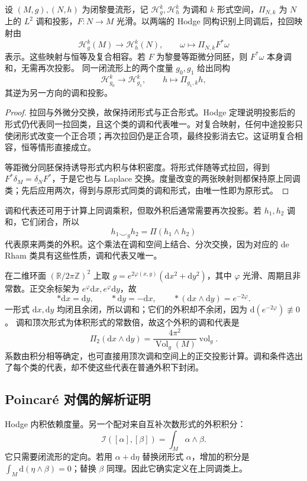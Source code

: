 \begin{proposition}\label{g3:prop:hodge-naturality}
	设 \((M,g),(N,h)\) 为闭黎曼流形，记 \(\mathcal H_g^k,\mathcal H_h^k\) 为调和 \(k\) 形式空间，\(\Pi_{N,k}\) 为 \(N\) 上的 \(L^2\) 调和投影，\(F:N\to M\) 光滑。以两端的 Hodge 同构识别上同调后，拉回映射由
	\[
		\mathcal H_g^k(M)\longrightarrow\mathcal H_h^k(N),
		\qquad\omega\longmapsto\Pi_{N,k}F^*\omega
	\]
	表示。这些映射与恒等及复合相容。若 \(F\) 为黎曼等距微分同胚，则 \(F^*\omega\) 本身调和，无需再次投影。
	同一闭流形上的两个度量 \(g_0,g_1\) 给出同构
	\[
		\mathcal H_{g_0}^k\longrightarrow\mathcal H_{g_1}^k,
		\qquad h\longmapsto\Pi_{g_1,k}h,
	\]
	其逆为另一方向的调和投影。
\end{proposition}
\begin{proof}
	拉回与外微分交换，故保持闭形式与正合形式。Hodge 定理说明投影后的形式仍代表同一拉回类，且这个类的调和代表唯一。对复合映射，任何中途投影只使闭形式改变一个正合项；再次拉回仍是正合项，最终投影消去它。这证明复合相容，恒等情形直接成立。

	等距微分同胚保持诱导形式内积与体积密度。将形式伴随等式拉回，得到 \(F^*\delta_M=\delta_NF^*\)，于是它也与 Laplace 交换。度量改变的两张映射则都保持原上同调类；先后应用两次，得到与原形式同类的调和形式，由唯一性即为原形式。
\end{proof}

调和代表还可用于计算上同调乘积，但取外积后通常需要再次投影。若 \(h_1,h_2\) 调和，它们闭合，所以
\[
	h_1\mathbin{\smile_g}h_2=\Pi(h_1\wedge h_2)
\]
代表原来两类的外积。这个乘法在调和空间上结合、分次交换，因为对应的 de Rham 类具有这些性质，调和代表又唯一。

\begin{example}\label{g3:exm:harmonic-wedge-not-harmonic}
	在二维环面 \((\mathbb R/2\pi\mathbb Z)^2\) 上取
	\(g=e^{2\varphi(x,y)}(\mathrm dx^2+\mathrm dy^2)\)，其中 \(\varphi\) 光滑、周期且非常数。正交余标架为 \(e^\varphi\mathrm dx,e^\varphi\mathrm dy\)，故
	\[
		*\mathrm dx=\mathrm dy,\qquad *\mathrm dy=-\mathrm dx,\qquad
		*(\mathrm dx\wedge\mathrm dy)=e^{-2\varphi}.
	\]
	一形式 \(\mathrm dx,\mathrm dy\) 均闭且余闭，所以调和；它们的外积却不余闭，因为
	\(\mathrm d(e^{-2\varphi})\not\equiv0\)。
	调和顶次形式为体积形式的常数倍，故这个外积的调和代表是
	\[
		\Pi_2(\mathrm dx\wedge\mathrm dy)
		=\frac{4\pi^2}{\operatorname{Vol}_g(M)}\operatorname{vol}_g.
	\]
	系数由积分相等确定，也可直接用顶次调和空间上的正交投影计算。调和条件选出了每个类的代表，却不使这些代表在普通外积下封闭。
\end{example}

\subsection{Poincaré 对偶的解析证明}
\label{g3:subsec:1502:04}
Hodge 内积依赖度量。另一个配对来自互补次数形式的外积积分：
\[
	\mathcal I([\alpha],[\beta])=\int_M\alpha\wedge\beta.
\]
它只需要闭流形的定向。若用 \(\alpha+\mathrm d\eta\) 替换闭形式 \(\alpha\)，增加的积分是 \(\int_M\mathrm d(\eta\wedge\beta)=0\)；替换 \(\beta\) 同理。因此它确实定义在上同调类上。

